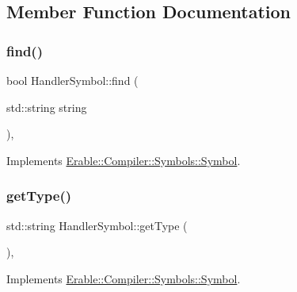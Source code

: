 \subsection{Member Function Documentation}
\mbox{\label{class_erable_1_1_compiler_1_1_symbols_1_1_handler_symbol_a04f772599f70bfad40ccb8b4facd6cb0}} 
\subsubsection{\texorpdfstring{find()}{find()}}
{\footnotesize\ttfamily bool Handler\+Symbol\+::find (\begin{DoxyParamCaption}\item[{std\+::string}]{string }\end{DoxyParamCaption})\hspace{0.3cm}{\ttfamily [override]}, {\ttfamily [virtual]}}



Implements \mbox{\hyperlink{class_erable_1_1_compiler_1_1_symbols_1_1_symbol_ac1d8b1392aef2e93bd47520a86f8617f}{Erable\+::\+Compiler\+::\+Symbols\+::\+Symbol}}.

\mbox{\label{class_erable_1_1_compiler_1_1_symbols_1_1_handler_symbol_a70340ea487e496cced8c05aa45968b56}} 
\subsubsection{\texorpdfstring{getType()}{getType()}}
{\footnotesize\ttfamily std\+::string Handler\+Symbol\+::get\+Type (\begin{DoxyParamCaption}{ }\end{DoxyParamCaption})\hspace{0.3cm}{\ttfamily [override]}, {\ttfamily [virtual]}}



Implements \mbox{\hyperlink{class_erable_1_1_compiler_1_1_symbols_1_1_symbol_a63b41d0942e5d65288fa3fc9d466ab43}{Erable\+::\+Compiler\+::\+Symbols\+::\+Symbol}}.

